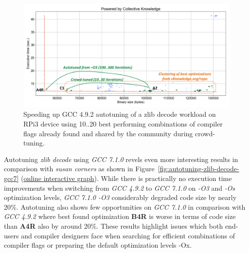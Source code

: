    \begin{figure}[!htbp]
     \centering
      \includegraphics[width=5.2in]
      {ck-assets/749a8998a2e29db5-cropped.pdf} %
      \vspace{0.1in}
      \vspace{0.1in}
     \caption{
      Speeding up GCC 4.9.2 autotuning of a zlib decode workload on RPi3 device using 
      10..20 best performing combinations of compiler flags already found and shared by the community
      during crowd-tuning.
     }
     \label{fig:autotuning-zlib-decode-gcc4-reactions}
   \end{figure}

Autotuning \textit{zlib decode} using \textit{GCC 7.1.0} revels even more interesting results
in comparison with \textit{susan corners} as shown in Figure~\ref{fig:autotuning-zlib-decode-gcc7} 
(\href{http://cknowledge.org/repo/web.php?wcid=graph:2bf38fd88a0e3ba1&subgraph=rpi3-autotuning-zlib-decode-gcc7-interactive}{online interactive graph}).
%
While there is practically no execution time improvements when switching from \textit{GCC 4.9.2} to \textit{GCC 7.1.0}
on \textit{-O3} and \textit{-Os} optimization levels, \textit{GCC 7.1.0 -O3} considerably degraded code size by nearly 20\%.
%
Autotuning also shows few opportunities on \textit{GCC 7.1.0} in comparison with \textit{GCC 4.9.2}
where best found optimization \textbf{B4R} is worse in terms of code size than \textbf{A4R} also by around 20\%.
%
These results highlight issues which both end-users and compiler designers face
when searching for efficient combinations of compiler flags or preparing the 
default optimization levels -Ox.

